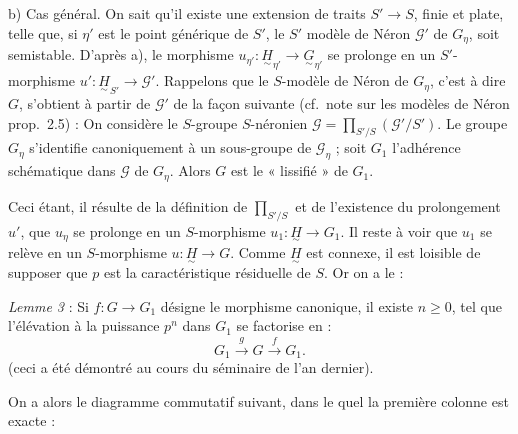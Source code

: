 \documentclass[11pt,a4paper]{article}
\begin{document}
b) Cas général. On sait qu'il existe une extension de traits $S' \to S$,
finie et plate, telle que, si $\eta'$ est le point générique de $S'$, le $S'$
modèle de Néron $\mathcal{G}'$ de $G_\eta$, soit semistable. D'après a), le
morphisme $u_{\eta'} : \underset{\sim}{H}_{\eta'} \to \underset{\sim}{G}_{\eta'}$
se prolonge en un $S'$-morphisme
$u' : \underset{\sim}{H}_{S'} \to \mathcal{G}'$. Rappelons que le $S$-modèle
de Néron de $G_\eta$, c'est à dire $G$, s'obtient à partir de $\mathcal{G}'$
de la façon suivante (cf.\ note sur les modèles de Néron prop.\ 2.5) :
On considère le $S$-groupe $S$-néronien
$\mathcal{G} = \prod_{S'/S} (\mathcal{G}'/S')$. Le groupe $G_\eta$
s'identifie canoniquement à un sous-groupe de $\mathcal{G}_\eta$ ; soit $G_1$
l'adhérence schématique dans $\mathcal{G}$ de $G_\eta$. Alors $G$ est le
« lissifié » de $G_1$.

Ceci étant, il résulte de la définition de $\prod_{S'/S}$ et de l'existence
du prolongement $u'$, que $u_\eta$ se prolonge en un $S$-morphisme
$u_1 : \underset{\sim}{H} \to G_1$. Il reste à voir que $u_1$ se relève en un
$S$-morphisme $u : \underset{\sim}{H} \to G$. Comme $\underset{\sim}{H}$ est
connexe, il est loisible de supposer que $p$ est la caractéristique
résiduelle de $S$. Or on a le :

\emph{Lemme 3} : Si $f : G \to G_1$ désigne le morphisme canonique, il
existe $n \geqslant 0$, tel que l'élévation à la puissance $p^n$ dans $G_1$ se
factorise en :
\[
  G_1 \xrightarrow{\;g\;} G \xrightarrow{\;f\;} G_1 .
\]
(ceci a été démontré au cours du séminaire de l'an dernier).

On a alors le diagramme commutatif suivant, dans le quel la première colonne
est exacte :

\end{document}
